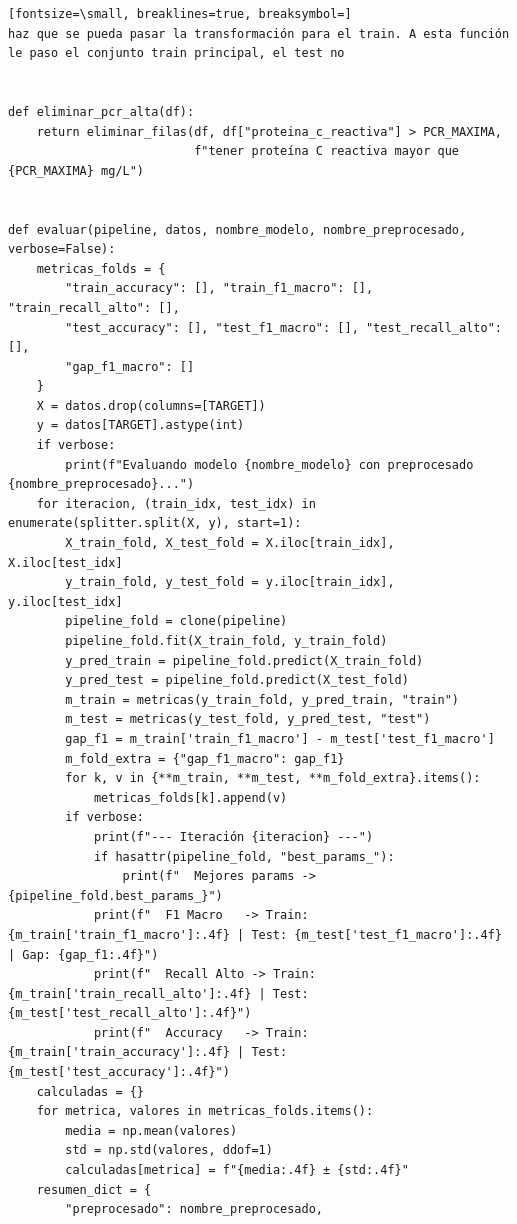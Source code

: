 \documentclass[12pt,a4paper,oneside]{book}
\begin{document}
\begin{iaprompt}
\begin{Verbatim}[fontsize=\small, breaklines=true, breaksymbol=]
haz que se pueda pasar la transformación para el train. A esta función le paso el conjunto train principal, el test no


def eliminar_pcr_alta(df):
    return eliminar_filas(df, df["proteina_c_reactiva"] > PCR_MAXIMA,
                          f"tener proteína C reactiva mayor que {PCR_MAXIMA} mg/L")


def evaluar(pipeline, datos, nombre_modelo, nombre_preprocesado, verbose=False):
    metricas_folds = {
        "train_accuracy": [], "train_f1_macro": [], "train_recall_alto": [],
        "test_accuracy": [], "test_f1_macro": [], "test_recall_alto": [],
        "gap_f1_macro": []
    }
    X = datos.drop(columns=[TARGET])
    y = datos[TARGET].astype(int)
    if verbose:
        print(f"Evaluando modelo {nombre_modelo} con preprocesado {nombre_preprocesado}...")
    for iteracion, (train_idx, test_idx) in enumerate(splitter.split(X, y), start=1):
        X_train_fold, X_test_fold = X.iloc[train_idx], X.iloc[test_idx]
        y_train_fold, y_test_fold = y.iloc[train_idx], y.iloc[test_idx]
        pipeline_fold = clone(pipeline)
        pipeline_fold.fit(X_train_fold, y_train_fold)
        y_pred_train = pipeline_fold.predict(X_train_fold)
        y_pred_test = pipeline_fold.predict(X_test_fold)
        m_train = metricas(y_train_fold, y_pred_train, "train")
        m_test = metricas(y_test_fold, y_pred_test, "test")
        gap_f1 = m_train['train_f1_macro'] - m_test['test_f1_macro']
        m_fold_extra = {"gap_f1_macro": gap_f1}
        for k, v in {**m_train, **m_test, **m_fold_extra}.items():
            metricas_folds[k].append(v)
        if verbose:
            print(f"--- Iteración {iteracion} ---")
            if hasattr(pipeline_fold, "best_params_"):
                print(f"  Mejores params -> {pipeline_fold.best_params_}")
            print(f"  F1 Macro   -> Train: {m_train['train_f1_macro']:.4f} | Test: {m_test['test_f1_macro']:.4f} | Gap: {gap_f1:.4f}")
            print(f"  Recall Alto -> Train: {m_train['train_recall_alto']:.4f} | Test: {m_test['test_recall_alto']:.4f}")
            print(f"  Accuracy   -> Train: {m_train['train_accuracy']:.4f} | Test: {m_test['test_accuracy']:.4f}")
    calculadas = {}
    for metrica, valores in metricas_folds.items():
        media = np.mean(valores)
        std = np.std(valores, ddof=1)
        calculadas[metrica] = f"{media:.4f} ± {std:.4f}"
    resumen_dict = {
        "preprocesado": nombre_preprocesado,

\end{Verbatim}
\end{iaprompt}
\end{document}
